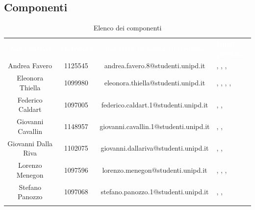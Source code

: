 \subsection{Componenti}
\begin{longtable}{ c  c  c  C{4cm} }
	\textcolor{white}{\textbf{Nominativo}} & \textcolor{white}{\textbf{Matricola}} & \textcolor{white}{\textbf{Indirizzo di posta elettronica}} & \textcolor{white}{\textbf{Ruoli previsti}}\\
	
	Andrea Favero & 1125545 & andrea.favero.8@studenti.unipd.it & \RdP, \prog, \progr, \ver \\
	
	Eleonora Thiella & 1099980 & eleonora.thiella@studenti.unipd.it & \RdP, \adm, \prog, \progr, \ver \\
	
	Federico Caldart & 1097005 & federico.caldart.1@studenti.unipd.it & \prog, \progr, \ver \\
	
	Giovanni Cavallin & 1148957 & giovanni.cavallin.1@studenti.unipd.it & \prog, \progr, \ver\\
	
	Giovanni Dalla Riva & 1102075 & giovanni.dallariva@studenti.unipd.it & \prog, \progr, \ver \\
	
	Lorenzo Menegon & 1097596 & lorenzo.menegon@studenti.unipd.it & \RdP, \prog, \progr, \ver \\
	
	Stefano Panozzo & 1097068 & stefano.panozzo.1@studenti.unipd.it & \prog, \progr, \ver \\
	\caption{Elenco dei componenti}\\
\end{longtable}